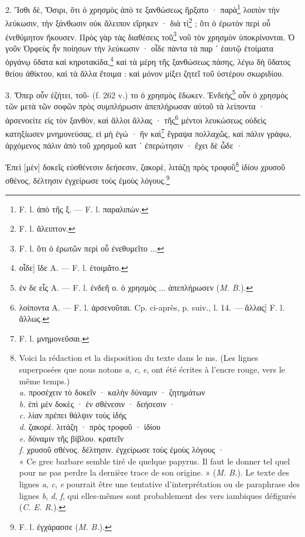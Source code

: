 \documentclass[a4paper, 11pt, oneside, polutonikogreek, french]{article}
\begin{document}
2. Ἴσθι δὲ, Ὄσιρι, ὅτι ὁ χρησμὸς ἀπὸ τε ξανθώσεως ἤρξατο · παρὰ\footnote{F. l. ἀπὸ τῆς ξ. --- F. l. παραλιπὼν.} λοιπὸν τὴν λεύκωσιν, τὴν ξάνθωσιν οὐκ ἄλειπον εἴρηκεν · διὰ τί\footnote{F. l. ἄλειπτον.} ; ὅτι ὁ ἐρωτὸν περὶ οὗ ἐνεθύμητον ἤκουσεν. Πρὸς γὰρ τὰς διαθέσεις τοῦ\footnote{F. l. ὅτι ὁ ἐρωτῶν περὶ οὗ ἐνεθυμεῖτο ...} νοῦ τὸν χρησμὸν ὑποκρίνονται. Ὁ γοῦν Ὀρφεὺς ἦν ποίησων τὴν λεύκωσιν · οἶδε πάντα τὰ παρ ᾽ ἑαυτῷ ἑτοίματα ὀργάνῳ ὕδατα καὶ κηροτακίδα,\footnote{οἶδε] ἴδε A. --- F. l. ἐτοιμᾶτο.} καὶ τὰ μέρη τῆς ξανθώσεως πάσης, λέγω δὴ ὕδατος θείου ἀθίκτου, καὶ τὰ ἄλλα ἔτοιμα : καὶ μόνον μίξει ζητεῖ τοῦ ὐστέρου σκωριδίου.

3. Ὅπερ οὖν ἐζήτει, τοῦ- (f. 262 v.) το ὁ χρησμὸς ἔδωκεν. Ἐνδεὴς\footnote{ἐν δε εἷς A. --- F. l. ἐνδεῆ ο. ὁ χρησμὸς ... ἀπεπλήρωσεν (\emph{M. B.}).} οὖν ὁ χρησμὸς τῶν μετὰ τῶν σοφῶν πρὸς συμπλήρωσιν ἀπεπλήρωσαν αὐτοῦ τὰ λείποντα · ἀρσενοείτε εἰς τὸν ξανθὸν, καὶ ἄλλοι ἄλλας · τῆς\footnote{λοίποντα A. --- F. l. ἀρσενοῦται. Cp. ci-après, p. suiv., l. 14. --- ἄλλας] F. l. ἄλλως.} μέντοι λευκώσεως οὐδεὶς κατηξίωσεν μνημονεύσας, εἰ μὴ ἐγώ · ἣν καὶ\footnote{F. l. μνημονεῦσαι.} ἔγραψα πολλαχῶς, καὶ πάλιν γράφω, ἀρχόμενος πάλιν ἀπὸ τοῦ χρησμοῦ κατ ᾽ ἐπερώτησιν · ἔχει δὲ ὧδε ·

Ἐπεὶ [μὲν] δοκεῖς εὐσθένεσιν δεήσεσιν, ζακορὲ, λιτάζῃ πρὸς τροφοῦ\footnote{Voici la rédaction et la disposition du texte dans le ms. (Les lignes superposées que nous notons \emph{a}, \emph{c}, \emph{e}, ont été écrites à l'encre rouge, vers le même temps.)\\\hspace*{5mm}\emph{a.} προσέχειν τὸ δοκεῖν · καλὴν δύναμιν · ζητημάτων\\\hspace*{5mm}\emph{b.} ἐπὶ μὲν δοκὲς · ἐν σθένεσιν · δεήσεσιν ·\\\hspace*{5mm}\emph{c.} λίαν πρέπει θάλψιν τοὺς ἰδὴς\\\hspace*{5mm}\emph{d.} ζακορέ. λιτἀζη · πρὸς τροφοῦ · ἰδίου\\\hspace*{5mm}\emph{e.} δύναμιν τῆς βίβλου. κρατεῖν\\\hspace*{5mm}\emph{f.} χρυσοῦ σθένος. δέλτησιν. ἐγχείρωσε τοὺς ἐμοὺς λόγους ·\\\hspace*{5mm}« Ce grec barbare semble tiré de quelque papyrus. Il faut le donner tel quel pour ne pas perdre la dernière trace de son origine. » (\emph{M. B.}). Le texte des lignes \emph{a}, \emph{c}, \emph{e} pourrait être une tentative d'interprétation ou de paraphrase des lignes \emph{b}, \emph{d}, \emph{f}, qui elles-mêmes sont probablement des vers iambiques défigurés (\emph{C. E. R.}).} ἰδίου χρυσοῦ σθένος, δέλτησιν ἐγχείρωσε τοὺς ἐμοὺς λόγους.\footnote{F. l. ἐγχάρασσε (\emph{M. B.}).}
\end{document}
